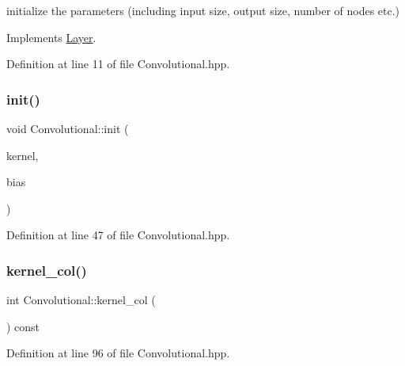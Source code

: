 initialize the parameters (including input size, output size, number of nodes etc.) 



Implements \hyperlink{class_layer_aab662b9c8e61cd7375cbb4413d2e3037}{Layer}.



Definition at line 11 of file Convolutional.\+hpp.

\mbox{\label{class_convolutional_af5b6f0726d5f7d0c8e4122e3e32a3abb}} 
\subsubsection{\texorpdfstring{init()}{init()}\hspace{0.1cm}{\footnotesize\ttfamily [2/2]}}
{\footnotesize\ttfamily void Convolutional\+::init (\begin{DoxyParamCaption}\item[{std\+::vector$<$ std\+::vector$<$ Eigen\+::\+Matrix\+Xd $>$$>$}]{kernel,  }\item[{std\+::vector$<$ double $>$}]{bias }\end{DoxyParamCaption})}



Definition at line 47 of file Convolutional.\+hpp.

\mbox{\label{class_convolutional_a6970108a6579ab0def8e4faac59023ca}} 
\subsubsection{\texorpdfstring{kernel\+\_\+col()}{kernel\_col()}}
{\footnotesize\ttfamily int Convolutional\+::kernel\+\_\+col (\begin{DoxyParamCaption}{ }\end{DoxyParamCaption}) const}



Definition at line 96 of file Convolutional.\+hpp.

\mbox{\label{class_convolutional_aa298488e132540e32e8f41e10a33503f}} 
